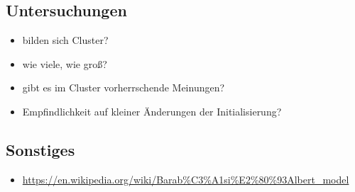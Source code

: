 \documentclass[11pt, a4paper]{scrartcl}
\begin{document}
\subsection{Untersuchungen}
\begin{itemize}
\item bilden sich Cluster?
\item wie viele, wie groß?
\item gibt es im Cluster vorherrschende Meinungen?
\item Empfindlichkeit auf kleiner Änderungen der Initialisierung?
\end{itemize}

\subsection{Sonstiges}
\begin{itemize}
\item \url{https://en.wikipedia.org/wiki/Barab%C3%A1si%E2%80%93Albert_model}
\end{itemize}
\end{document}
